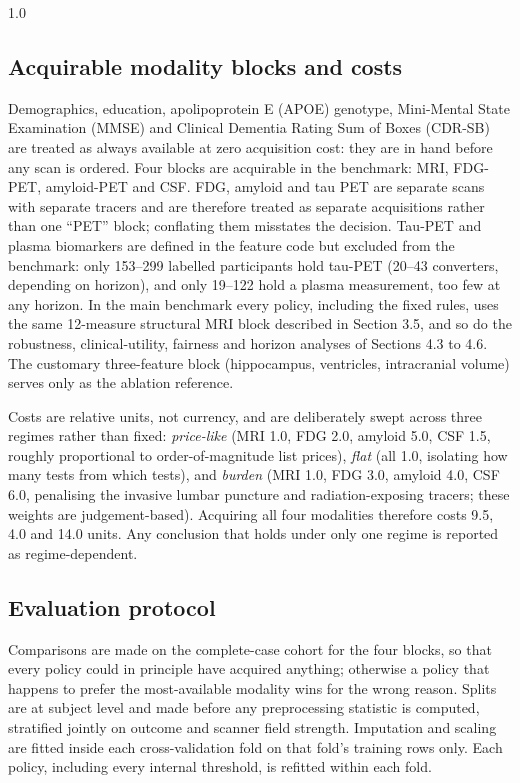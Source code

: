 \documentclass[12pt,twoside]{article}
\begin{document}
\begin{spacing}{1.0}
\subsection{Acquirable modality blocks and costs}
Demographics, education, apolipoprotein E (APOE) genotype, Mini-Mental State
Examination (MMSE) and Clinical Dementia Rating Sum of Boxes (CDR-SB) are
treated as always available at zero acquisition cost: they are in hand
before any scan is ordered. Four blocks are acquirable in the benchmark:
MRI, FDG-PET, amyloid-PET and CSF. FDG, amyloid and tau PET are separate
scans with separate tracers and are therefore treated as separate
acquisitions rather than one ``PET'' block; conflating them misstates the
decision. Tau-PET and plasma biomarkers are defined in the feature code but
excluded from the benchmark: only 153--299 labelled participants hold tau-PET
(20--43 converters, depending on horizon), and only 19--122 hold a plasma
measurement, too few at any horizon. In the main benchmark every policy, including the
fixed rules, uses the same 12-measure structural MRI block described in
Section 3.5, and so do the robustness, clinical-utility, fairness and
horizon analyses of Sections 4.3 to 4.6. The customary three-feature block
(hippocampus, ventricles, intracranial volume) serves only as the ablation
reference.

Costs are relative units, not currency, and are deliberately swept across
three regimes rather than fixed: \emph{price-like} (MRI 1.0, FDG 2.0,
amyloid 5.0, CSF 1.5, roughly proportional to order-of-magnitude list
prices), \emph{flat} (all 1.0, isolating how many tests from which tests),
and \emph{burden} (MRI 1.0, FDG 3.0, amyloid 4.0, CSF 6.0, penalising the
invasive lumbar puncture and radiation-exposing tracers; these weights are
judgement-based). Acquiring all four modalities therefore costs 9.5, 4.0 and
14.0 units. Any conclusion that holds under only one regime is reported as
regime-dependent.

\subsection{Evaluation protocol}
Comparisons are made on the complete-case cohort for the four blocks, so
that every policy could in principle have acquired anything; otherwise a
policy that happens to prefer the most-available modality wins for the wrong
reason. Splits are at subject level and made before any preprocessing
statistic is computed, stratified jointly on outcome and scanner field
strength. Imputation and scaling are fitted inside each cross-validation
fold on that fold's training rows only. Each policy, including every
internal threshold, is refitted within each fold.


\end{spacing}
\end{document}
